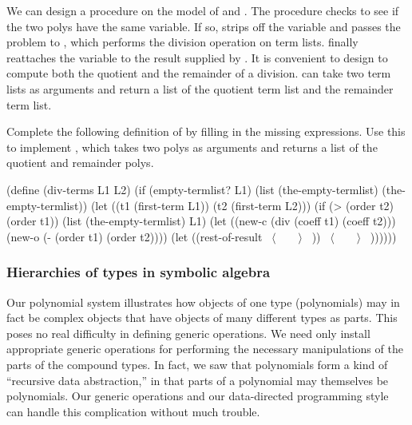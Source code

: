 \begin{exerciseGroup}
We can design a  procedure on the model of  and
. The procedure checks to see if the two polys have the same
variable.  If so,  strips off the variable and passes the
problem to , which performs the division operation on term
lists.  finally reattaches the variable to the result supplied
by .  It is convenient to design  to compute
both the quotient and the remainder of a division.   can take
two term lists as arguments and return a list of the quotient term list and the
remainder term list.

Complete the following definition of  by filling in the missing
expressions.  Use this to implement , which takes two polys as
arguments and returns a list of the quotient and remainder polys.

\begin{compactCodeBlock}
(define (div-terms L1 L2)
  (if (empty-termlist? L1)
      (list (the-empty-termlist) (the-empty-termlist))
      (let ((t1 (first-term L1))
            (t2 (first-term L2)))
        (if (> (order t2) (order t1))
            (list (the-empty-termlist) L1)
            (let ((new-c (div (coeff t1) (coeff t2)))
                  (new-o (- (order t1) (order t2))))
              (let ((rest-of-result
                     ~\( \langle \)~~~~\( \rangle \)~ ))
                ~\( \langle \)~~~~\( \rangle \)~ ))))))
\end{compactCodeBlock}
\end{exerciseGroup}

\subsubsection*{Hierarchies of types in symbolic algebra}

Our polynomial system illustrates how objects of one type (polynomials) may in
fact be complex objects that have objects of many different types as parts.
This poses no real difficulty in defining generic operations.  We need only
install appropriate generic operations for performing the necessary
manipulations of the parts of the compound types.  In fact, we saw that
polynomials form a kind of ``recursive data abstraction,'' in that parts of a
polynomial may themselves be polynomials.  Our generic operations and our
data-directed programming style can handle this complication without much
trouble.

